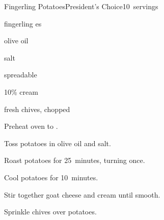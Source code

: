 \begin{recipe}{Fingerling Potatoes}{President's Choice}{10~servings}

\begin{ingredients}
\item {} fingerling es
\item {} olive oil
\item \tp{\half} salt
\item {} spreadable 
\item {} 10\% cream
\item {} fresh chives, chopped
\end{ingredients}

\begin{directions}
\item Preheat oven to .
\item Toss potatoes in olive oil and salt.
\item Roast potatoes for 25~minutes, turning once.
\item Cool potatoes for 10~minutes.
\item Stir together goat cheese and cream until smooth.
\item Sprinkle chives over potatoes.
\end{directions}

\end{recipe}
